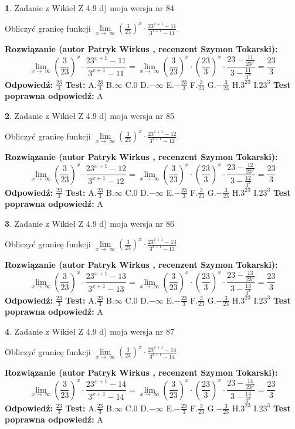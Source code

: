 \documentclass[12pt, a4paper]{article}
\theoremstyle{definition} %
\newtheorem{zad}{}
\newcommand{\zadStart}[1]{\begin{zad}#1\newline}
\newcommand{\zadStop}{\end{zad}}
\newcommand{\rozwStart}[2]{\noindent \textbf{Rozwiązanie (autor #1 , recenzent #2): }\newline}
\newcommand{\rozwStop}{\newline}
\newcommand{\odpStart}{\noindent \textbf{Odpowiedź:}\newline}
\newcommand{\odpStop}{\newline}
\newcommand{\testStart}{\noindent \textbf{Test:}\newline}
\newcommand{\testStop}{\newline}
\newcommand{\kluczStart}{\noindent \textbf{Test poprawna odpowiedź:}\newline}
\newcommand{\kluczStop}{\newline}
\begin{document}
\zadStart{Zadanie z Wikieł Z 4.9 d) moja wersja nr 84}


Obliczyć granicę funkcji  $\lim\limits_{x\to\ \infty}(\frac{3}{23})^{x}\cdot\frac{23^{x+1}-11}{3^{x+1}-11}$.
\zadStop
\rozwStart{Patryk Wirkus}{Szymon Tokarski}
$$\lim\limits_{x\to\ \infty}(\frac{3}{23})^{x}\cdot\frac{23^{x+1}-11}{3^{x+1}-11}=\lim\limits_{x\to\ \infty}(\frac{3}{23})^{x}\cdot(\frac{23}{3})^{x} \cdot \frac{23-\frac{11}{23^{x}}}{3-\frac{11}{3^{x}}} = \frac{23}{3}$$
\rozwStop
\odpStart
$\frac{23}{3}$
\odpStop
\testStart
A.$\frac{23}{3}$ B.$\infty$ C.$0$ D.$-\infty$ E.$-\frac{23}{3}$
F.$\frac{3}{23}$ G.$-\frac{3}{23}$
H.$3^{23}$
I.$23^{3}$
\testStop
\kluczStart
A
\kluczStop



\zadStart{Zadanie z Wikieł Z 4.9 d) moja wersja nr 85}


Obliczyć granicę funkcji  $\lim\limits_{x\to\ \infty}(\frac{3}{23})^{x}\cdot\frac{23^{x+1}-12}{3^{x+1}-12}$.
\zadStop
\rozwStart{Patryk Wirkus}{Szymon Tokarski}
$$\lim\limits_{x\to\ \infty}(\frac{3}{23})^{x}\cdot\frac{23^{x+1}-12}{3^{x+1}-12}=\lim\limits_{x\to\ \infty}(\frac{3}{23})^{x}\cdot(\frac{23}{3})^{x} \cdot \frac{23-\frac{12}{23^{x}}}{3-\frac{12}{3^{x}}} = \frac{23}{3}$$
\rozwStop
\odpStart
$\frac{23}{3}$
\odpStop
\testStart
A.$\frac{23}{3}$ B.$\infty$ C.$0$ D.$-\infty$ E.$-\frac{23}{3}$
F.$\frac{3}{23}$ G.$-\frac{3}{23}$
H.$3^{23}$
I.$23^{3}$
\testStop
\kluczStart
A
\kluczStop



\zadStart{Zadanie z Wikieł Z 4.9 d) moja wersja nr 86}


Obliczyć granicę funkcji  $\lim\limits_{x\to\ \infty}(\frac{3}{23})^{x}\cdot\frac{23^{x+1}-13}{3^{x+1}-13}$.
\zadStop
\rozwStart{Patryk Wirkus}{Szymon Tokarski}
$$\lim\limits_{x\to\ \infty}(\frac{3}{23})^{x}\cdot\frac{23^{x+1}-13}{3^{x+1}-13}=\lim\limits_{x\to\ \infty}(\frac{3}{23})^{x}\cdot(\frac{23}{3})^{x} \cdot \frac{23-\frac{13}{23^{x}}}{3-\frac{13}{3^{x}}} = \frac{23}{3}$$
\rozwStop
\odpStart
$\frac{23}{3}$
\odpStop
\testStart
A.$\frac{23}{3}$ B.$\infty$ C.$0$ D.$-\infty$ E.$-\frac{23}{3}$
F.$\frac{3}{23}$ G.$-\frac{3}{23}$
H.$3^{23}$
I.$23^{3}$
\testStop
\kluczStart
A
\kluczStop



\zadStart{Zadanie z Wikieł Z 4.9 d) moja wersja nr 87}


Obliczyć granicę funkcji  $\lim\limits_{x\to\ \infty}(\frac{3}{23})^{x}\cdot\frac{23^{x+1}-14}{3^{x+1}-14}$.
\zadStop
\rozwStart{Patryk Wirkus}{Szymon Tokarski}
$$\lim\limits_{x\to\ \infty}(\frac{3}{23})^{x}\cdot\frac{23^{x+1}-14}{3^{x+1}-14}=\lim\limits_{x\to\ \infty}(\frac{3}{23})^{x}\cdot(\frac{23}{3})^{x} \cdot \frac{23-\frac{14}{23^{x}}}{3-\frac{14}{3^{x}}} = \frac{23}{3}$$
\rozwStop
\odpStart
$\frac{23}{3}$
\odpStop
\testStart
A.$\frac{23}{3}$ B.$\infty$ C.$0$ D.$-\infty$ E.$-\frac{23}{3}$
F.$\frac{3}{23}$ G.$-\frac{3}{23}$
H.$3^{23}$
I.$23^{3}$
\testStop
\kluczStart
A
\kluczStop
\end{document}
